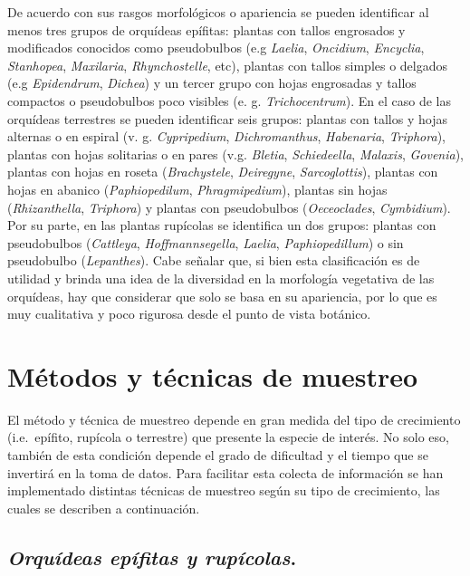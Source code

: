 \documentclass[
]{book}
\theoremstyle{definition}
\theoremstyle{definition}
\theoremstyle{definition}
\theoremstyle{definition}
\theoremstyle{remark}
\begin{document}
De acuerdo con sus rasgos morfológicos o apariencia se pueden identificar al menos tres grupos de orquídeas epífitas: plantas con tallos engrosados y modificados conocidos como pseudobulbos (e.g \emph{Laelia}, \emph{Oncidium}, \emph{Encyclia}, \emph{Stanhopea}, \emph{Maxilaria}, \emph{Rhynchostelle}, etc), plantas con tallos simples o delgados (e.g \emph{Epidendrum}, \emph{Dichea}) y un tercer grupo con hojas engrosadas y tallos compactos o pseudobulbos poco visibles (e. g. \emph{Trichocentrum}).
En el caso de las orquídeas terrestres se pueden identificar seis grupos: plantas con tallos y hojas alternas o en espiral (v. g. \emph{Cypripedium}, \emph{Dichromanthus}, \emph{Habenaria}, \emph{Triphora}), plantas con hojas solitarias o en pares (v.g. \emph{Bletia}, \emph{Schiedeella}, \emph{Malaxis}, \emph{Govenia}), plantas con hojas en roseta (\emph{Brachystele}, \emph{Deiregyne}, \emph{Sarcoglottis}), plantas con hojas en abanico (\emph{Paphiopedilum}, \emph{Phragmipedium}), plantas sin hojas (\emph{Rhizanthella}, \emph{Triphora}) y plantas con pseudobulbos (\emph{Oeceoclades}, \emph{Cymbidium}).
Por su parte, en las plantas rupícolas se identifica un dos grupos: plantas con pseudobulbos (\emph{Cattleya}, \emph{Hoffmannsegella}, \emph{Laelia}, \emph{Paphiopedillum}) o sin pseudobulbo (\emph{Lepanthes}).
Cabe señalar que, si bien esta clasificación es de utilidad y brinda una idea de la diversidad en la morfología vegetativa de las orquídeas, hay que considerar que solo se basa en su apariencia, por lo que es muy cualitativa y poco rigurosa desde el punto de vista botánico.

\section{Métodos y técnicas de muestreo}\label{muxe9todos-y-tuxe9cnicas-de-muestreo}

El método y técnica de muestreo depende en gran medida del tipo de crecimiento (i.e.~epífito, rupícola o terrestre) que presente la especie de interés.
No solo eso, también de esta condición depende el grado de dificultad y el tiempo que se invertirá en la toma de datos.
Para facilitar esta colecta de información se han implementado distintas técnicas de muestreo según su tipo de crecimiento, las cuales se describen a continuación.

\subsection{\texorpdfstring{\emph{Orquídeas epífitas y rupícolas}.}{Orquídeas epífitas y rupícolas.}}\label{orquuxeddeas-epuxedfitas-y-rupuxedcolas.}
\end{document}
